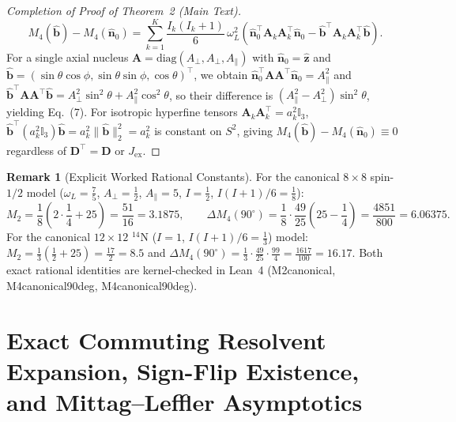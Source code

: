 \documentclass[onecolumn,10pt,notitlepage,amsmath,amssymb,floatfix]{revtex4-2}
\theoremstyle{plain}
\theoremstyle{definition}
\newtheorem{remark}[theorem]{Remark}
\newcommand{\leanid}[1]{{\footnotesize\ttfamily\def\_{\textunderscore\allowbreak}#1}}
\begin{document}
\begin{proof}[Completion of Proof of Theorem~2 (Main Text)]
\begin{equation}
\label{eq:S1_M4_diff_final}
M_4(\hat{\mathbf{b}}) - M_4(\hat{\mathbf{n}}_0)
= \sum_{k=1}^K \frac{I_k(I_k+1)}{6}\,\omega_L^2\left(\hat{\mathbf{n}}_0^\top \mathbf{A}_k \mathbf{A}_k^\top \hat{\mathbf{n}}_0 - \hat{\mathbf{b}}^\top \mathbf{A}_k \mathbf{A}_k^\top \hat{\mathbf{b}}\right).
\end{equation}
For a single axial nucleus $\mathbf{A} = \mathrm{diag}(A_\perp, A_\perp, A_\parallel)$ with $\hat{\mathbf{n}}_0 = \hat{\mathbf{z}}$ and $\hat{\mathbf{b}} = (\sin\theta\cos\phi, \sin\theta\sin\phi, \cos\theta)^\top$, we obtain $\hat{\mathbf{n}}_0^\top \mathbf{A}\mathbf{A}^\top \hat{\mathbf{n}}_0 = A_\parallel^2$ and $\hat{\mathbf{b}}^\top \mathbf{A}\mathbf{A}^\top \hat{\mathbf{b}} = A_\perp^2 \sin^2\theta + A_\parallel^2 \cos^2\theta$, so their difference is $(A_\parallel^2 - A_\perp^2)\sin^2\theta$, yielding Eq.~(7). For isotropic hyperfine tensors $\mathbf{A}_k\mathbf{A}_k^\top = a_k^2 \mathbb{I}_3$, $\hat{\mathbf{b}}^\top (a_k^2 \mathbb{I}_3) \hat{\mathbf{b}} = a_k^2 \|\hat{\mathbf{b}}\|_2^2 = a_k^2$ is constant on $S^2$, giving $M_4(\hat{\mathbf{b}}) - M_4(\hat{\mathbf{n}}_0) \equiv 0$ regardless of $\mathbf{D}^\top = \mathbf{D}$ or $J_{\mathrm{ex}}$.
\end{proof}

\begin{remark}[Explicit Worked Rational Constants]
For the canonical $8\times 8$ spin-$1/2$ model ($\omega_L = \frac{7}{5}$, $A_\perp = \frac{1}{2}$, $A_\parallel = 5$, $I = \frac{1}{2}$, $I(I+1)/6 = \frac{1}{8}$):
\[
M_2 = \frac{1}{8}\left(2\cdot\frac{1}{4} + 25\right) = \frac{51}{16} = 3.1875, \qquad
\Delta M_4(90^\circ) = \frac{1}{8}\cdot\frac{49}{25}\left(25 - \frac{1}{4}\right) = \frac{4851}{800} = 6.06375.
\]
For the canonical $12\times 12$ $^{14}\text{N}$ ($I=1$, $I(I+1)/6 = \frac{1}{3}$) model: $M_2 = \frac{1}{3}(\frac{1}{2} + 25) = \frac{17}{2} = 8.5$ and $\Delta M_4(90^\circ) = \frac{1}{3}\cdot\frac{49}{25}\cdot\frac{99}{4} = \frac{1617}{100} = 16.17$. Both exact rational identities are kernel-checked in Lean~4 (\leanid{M2\_8\_canonical}, \leanid{M4\_8\_canonical\_90deg}, \leanid{M4\_12\_canonical\_90deg}).
\end{remark}

\section{Exact Commuting Resolvent Expansion, Sign-Flip Existence, and Mittag--Leffler Asymptotics}
\label{sec:S2}
\end{document}
